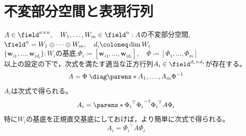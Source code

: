     \section{不変部分空間と表現行列}
        \label{不変部分空間と表現行列}
        \begin{shadebox}
            $A\in\field^{n\times n},\quad W_1,\dotsc,W_m\in\field^n : A$の不変部分空間,\quad$\field^n = W_1\oplus\dotsb\oplus W_m,\quad d_i \coloneq \dim{W_i}$\\
            $\{\bm{w}_{i1},\dotsc,\bm{w}_{id_i}\} : W_i$の基底,\quad$\Phi_i \coloneq [\bm{w}_{i1},\dotsc,\bm{w}_{id_i}],\quad \Phi \coloneq [\Phi_1,\dotsc,\Phi_m]$\\
            以上の設定の下で，次式を満たす適当な正方行列$A_i\in\field^{d_i\times d_i}$が存在する。
            \[A = \Phi\;\diag\parens*{A_1,\dotsc,A_m}\Phi^{-1}\]
            $A_i$は次式で得られる。
            \[A_i = \parens*{{\Phi_i}^\top\Phi_i}^{-1}{\Phi_i}^\top A\Phi_i\]
            特に$W_i$の基底を正規直交基底にしておけば，より簡単に次式で得られる。
            \[A_i = {\Phi_i}^\top A\Phi_i\]
        \end{shadebox}
